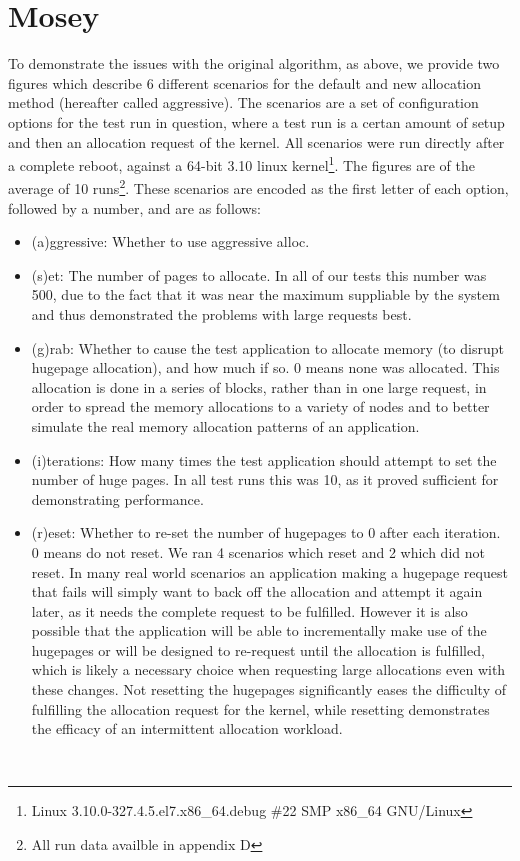 \documentclass{article}
\begin{document}
\section{Mosey}
To demonstrate the issues with the original algorithm, as above, we provide two figures which describe 6 different scenarios for the default and new allocation method (hereafter called aggressive). The scenarios are a set of configuration options for the test run in question, where a test run is a certan amount of setup and then an allocation request of the kernel. All scenarios were run directly after a complete reboot, against a 64-bit 3.10 linux kernel\footnote{Linux 3.10.0-327.4.5.el7.x86\_64.debug \#22 SMP x86\_64 GNU/Linux}. The figures are of the average of 10 runs\footnote{All run data availble in appendix D}. These scenarios are encoded as the first letter of each option, followed by a number, and are as follows:
\begin{itemize}
	\item (a)ggressive: Whether to use aggressive alloc.
	\item (s)et: The number of pages to allocate. In all of our tests this number was 500, due to the fact that it was near the maximum suppliable by the system and thus demonstrated the problems with large requests best.
	\item (g)rab: Whether to cause the test application to allocate memory (to disrupt hugepage allocation), and how much if so. 0 means none was allocated. This allocation is done in a series of blocks, rather than in one large request, in order to spread the memory allocations to a variety of nodes and to better simulate the real memory allocation patterns of an application.
	\item (i)terations: How many times the test application should attempt to set the number of huge pages. In all test runs this was 10, as it proved sufficient for demonstrating performance.
	\item (r)eset: Whether to re-set the number of hugepages to 0 after each iteration. 0 means do not reset. We ran 4 scenarios which reset and 2 which did not reset. In many real world scenarios an application making a hugepage request that fails will simply want to back off the allocation and attempt it again later, as it needs the complete request to be fulfilled. However it is also possible that the application will be able to incrementally make use of the hugepages or will be designed to re-request until the allocation is fulfilled, which is likely a necessary choice when requesting large allocations even with these changes. Not resetting the hugepages significantly eases the difficulty of fulfilling the allocation request for the kernel, while resetting demonstrates the efficacy of an intermittent allocation workload.
\end{itemize}\
\end{document}

